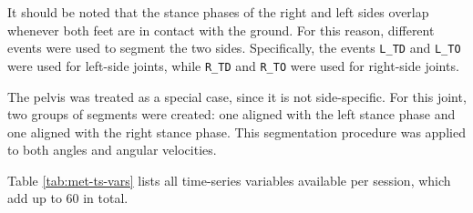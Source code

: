 It should be noted that the stance phases of the right and left sides overlap whenever both feet are in contact with the ground. For this reason, different events were used to segment the two sides. Specifically, the events \texttt{L\_TD} and \texttt{L\_TO} were used for left-side joints, while \texttt{R\_TD} and \texttt{R\_TO} were used for right-side joints.

The pelvis was treated as a special case, since it is not side-specific. For this joint, two groups of segments were created: one aligned with the left stance phase and one aligned with the right stance phase. This segmentation procedure was applied to both angles and angular velocities.

Table \ref{tab:met-ts-vars} lists all time-series variables available per session, which add up to 60 in total.

